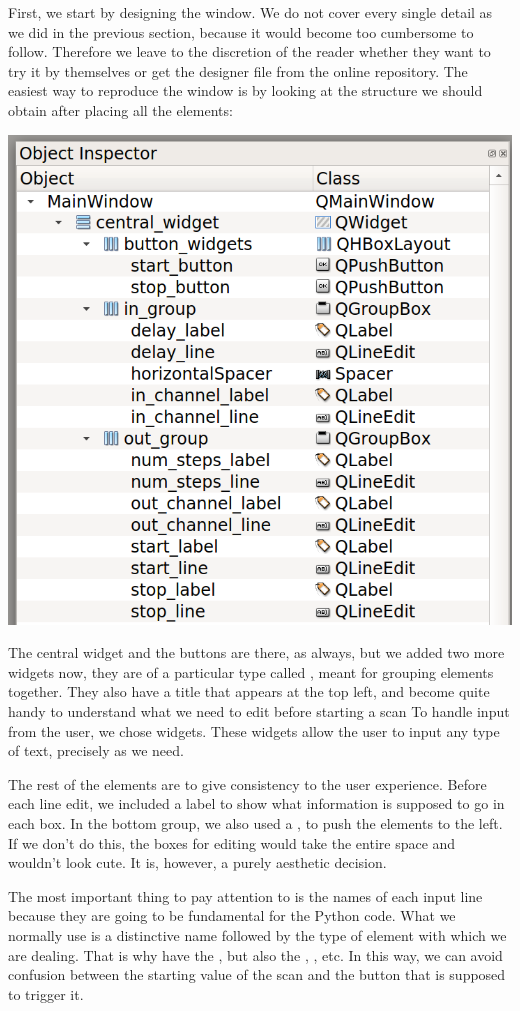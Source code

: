 First, we start by designing the window. We do not cover every single detail as we did in the previous section, because it would become too cumbersome to follow. Therefore we leave to the discretion of the reader whether they want to try it by themselves or get the designer file from the online repository. The easiest way to reproduce the window is by looking at the structure we should obtain after placing all the elements:

\begin{center}
    \includegraphics[width=.5\textwidth]{images/Chapter_09/09_final_window_structure.png}
\end{center}

The central widget and the buttons are there, as always, but we added two more widgets now, they are of a particular type called , meant for grouping elements together. They also have a title that appears at the top left, and become quite handy to understand what we need to edit before starting a scan To handle input from the user, we chose  widgets. These widgets allow the user to input any type of text, precisely as we need.

The rest of the elements are to give consistency to the user experience. Before each line edit, we included a label to show what information is supposed to go in each box. In the bottom group, we also used a , to push the elements to the left. If we don't do this, the boxes for editing would take the entire space and wouldn't look cute. It is, however, a purely aesthetic decision.

The most important thing to pay attention to is the names of each input line because they are going to be fundamental for the Python code. What we normally use is a distinctive name followed by the type of element with which we are dealing. That is why have the , but also the , , etc. In this way, we can avoid confusion between the starting value of the scan and the button that is supposed to trigger it.

